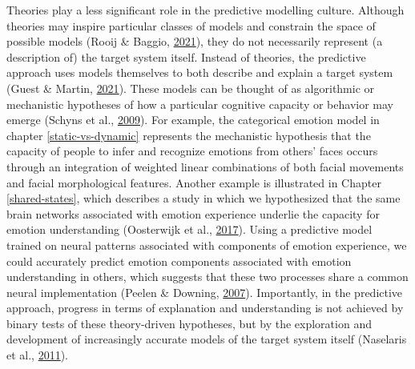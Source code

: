 \documentclass[12pt,american,a4paper,oneside,]{memoir} %
\begin{document}
Theories play a less significant role in the predictive modelling culture. Although theories may inspire particular classes of models and constrain the space of possible models (Rooij \& Baggio, \protect\hyperlink{ref-Van_Rooij2021-bk}{2021}), they do not necessarily represent (a description of) the target system itself. Instead of theories, the predictive approach uses models themselves to both describe and explain a target system (Guest \& Martin, \protect\hyperlink{ref-Guest2020-ef}{2021}). These models can be thought of as algorithmic or mechanistic hypotheses of how a particular cognitive capacity or behavior may emerge (Schyns et al., \protect\hyperlink{ref-schyns2009information}{2009}). For example, the categorical emotion model in chapter \ref{static-vs-dynamic} represents the mechanistic hypothesis that the capacity of people to infer and recognize emotions from others' faces occurs through an integration of weighted linear combinations of both facial movements and facial morphological features. Another example is illustrated in Chapter \ref{shared-states}, which describes a study in which we hypothesized that the same brain networks associated with emotion experience underlie the capacity for emotion understanding (Oosterwijk et al., \protect\hyperlink{ref-Oosterwijk2017-sc}{2017}). Using a predictive model trained on neural patterns associated with components of emotion experience, we could accurately predict emotion components associated with emotion understanding in others, which suggests that these two processes share a common neural implementation (Peelen \& Downing, \protect\hyperlink{ref-Peelen2007-ew}{2007}). Importantly, in the predictive approach, progress in terms of explanation and understanding is not achieved by binary tests of these theory-driven hypotheses, but by the exploration and development of increasingly accurate models of the target system itself (Naselaris et al., \protect\hyperlink{ref-Naselaris2011-oh}{2011}).
\end{document}
